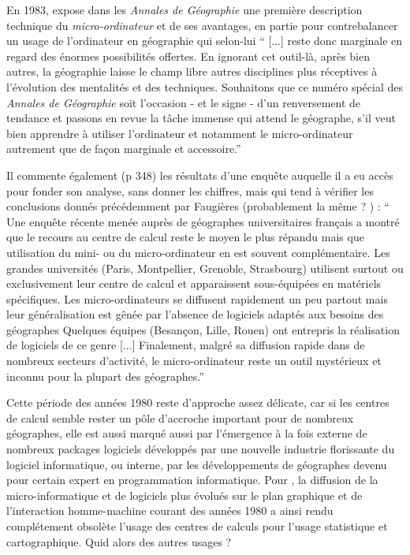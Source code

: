 En 1983, \textcite[367]{Lecarpentier1983} expose dans les \textit{Annales de Géographie} une première description technique du \textit{micro-ordinateur} et de ses avantages, en partie pour contrebalancer un usage de l'ordinateur en géographie qui selon-lui \enquote{ [...] reste donc marginale en regard des énormes possibilités offertes. En ignorant cet outil-là, après bien autres, la géographie laisse le champ libre autres disciplines plus réceptives à l'évolution des mentalités et des techniques. Souhaitons que ce numéro spécial des \textit{Annales de Géographie} soit l'occasion - et le signe - d'un renversement de tendance et passons en revue la tâche immense qui attend le géographe, s'il veut bien apprendre à utiliser l'ordinateur et notamment le micro-ordinateur autrement que de façon marginale et accessoire.}

Il commente également (p 348) les résultats d'une enquête auquelle il a eu accès pour fonder son analyse, sans donner les chiffres, mais qui tend à vérifier les conclusions donnés précédemment par Faugières (probablement la même ?  ) : \enquote{ Une enquête récente menée auprès de géographes universitaires français a montré que le recours au centre de calcul reste le moyen le plus répandu mais que utilisation du mini- ou du micro-ordinateur en est souvent complémentaire. Les grandes universités (Paris, Montpellier,  Grenoble, Strasbourg) utilisent surtout ou exclusivement leur centre de calcul et apparaissent sous-équipées en matériels spécifiques. Les micro-ordinateurs se diffusent rapidement un peu partout mais leur généralisation est gênée par l'absence de logiciels adaptés aux besoins des géographes Quelques équipes (Besançon, Lille, Rouen) ont entrepris la réalisation de logiciels de ce genre [...] Finalement, malgré sa diffusion rapide dans de nombreux secteurs d'activité, le micro-ordinateur reste un outil mystérieux et inconnu pour la plupart des géographes.}

Cette période des années 1980 reste d'approche assez délicate, car si les centres de calcul semble rester un pôle d'accroche important pour de nombreux géographes, elle est aussi marqué aussi par l’émergence à la fois externe de nombreux packages logiciels développés par une nouvelle industrie florissante du logiciel informatique, ou interne, par les développements de géographes devenu pour certain expert en programmation informatique. Pour \autocites[444]{Joliveau2004}{Waniez2010}, la diffusion de la micro-informatique et de logiciels plus évolués sur le plan graphique et de l’interaction homme-machine courant des années 1980 a ainsi rendu complétement obsolète l’usage des centres de calculs pour l’usage statistique et cartographique. Quid alors des autres usages ?

